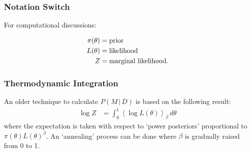 \documentclass{beamer}
\newcommand{\given}{\,|\,}
\begin{document}
\begin{frame}
\frametitle{Notation Switch}
For computational discussions:

\begin{align}
\pi(\theta) &= \textnormal{prior} \\
L(\theta) &= \textnormal{likelihood} \\
Z &= \textnormal{marginal likelihood}.
\end{align}

\end{frame}


\begin{frame}
\frametitle{Thermodynamic Integration}
An older technique to calculate $P(M\given D)$ is based on the following
result:
\begin{align}
\log Z &= \int_0^1 \left<\log L(\theta)\right>_\beta \, d\theta
\end{align}
\pause
where the expectation is taken with respect to `power posteriors'
proportional to $\pi(\theta)L(\theta)^\beta$. An `annealing' process can be done
where $\beta$ is gradually raised from 0 to 1.

\end{frame}
\end{document}
